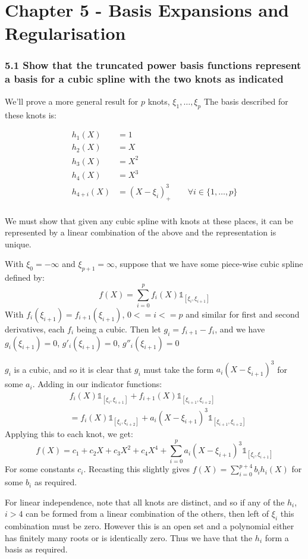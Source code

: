 
\chapter{Chapter 5 - Basis Expansions and Regularisation}

\subsection*{5.1 Show that the truncated power basis functions represent a basis for a cubic spline with the two knots as indicated}

We'll prove a more general result for $p$ knots, $\xi_1, \dots, \xi_p$
The basis described for these knots is:

\begin{align*}
    h_1(X) &= 1 \\
    h_2(X) &= X \\
    h_3(X) &= X^2 \\
    h_4(X) &= X^3 \\
    h_{4+i}(X) &= (X-\xi_i)^3_+ \hspace{2em}  \forall i \in \{1,\dots,p\} \\
\end{align*}

We must show that given any cubic spline with knots at these places, it can be represented by a linear combination of the above and the representation is unique.

With $\xi_0 = -\infty$ and $\xi_{p+1} = \infty$, suppose that we have some piece-wise cubic spline defined by: 
$$f(X) = \sum_{i=0}^p f_i(X)\mathbb{1}_{[\xi_i,\xi_{i+1}]}$$
With $f_i(\xi_{i+1}) = f_{i+1}(\xi_{i+1})$, $0 <= i <= p$ and similar for first and second derivatives, each $f_i$ being a cubic.
Then let $g_i = f_{i+1} - f_i$, and we have $g_i(\xi_{i+1})  = 0$,  $g'_i(\xi_{i+1})  = 0$,  $g''_i(\xi_{i+1})  = 0$

$g_i$ is a cubic, and so it is clear that $g_i$ must take the form $a_i(X - \xi_{i+1})^3$ for some $a_i$. Adding in our indicator functions:
\begin{align*}
    & f_i(X)\mathbb{1}_{[\xi_i,\xi_{i+1}]} + f_{i+1}(X)\mathbb{1}_{[\xi_{i+1},\xi_{i+2}]} \\
    &=  f_{i}(X)\mathbb{1}_{[\xi_i,\xi_{i+2}]} + a_i(X - \xi_{i+1})^3\mathbb{1}_{[\xi_{i+1},\xi_{i+2}]}
\end{align*}
Applying this to each knot, we get:
$$f(X) = c_1 + c_2 X + c_3 X^2 + c_4 X^4 + \sum_{i=0}^p a_i (X - \xi_{i+1})^3 \mathbb{1}_{[\xi_i,\xi_{i+1}]}$$ 
For some constants $c_i$. Recasting this slightly gives
$f(X) = \sum_{i=0}^{p+4} b_i h_i(X)$ for some $b_i$ as required.

For linear independence, note that all knots are distinct, and so if any of the $h_i$, $i>4$ can be formed from a linear combination of the others, then left of $\xi_i$ this combination must be zero. However this is an open set and a polynomial either has finitely many roots or is identically zero. Thus we have that the $h_i$ form a basis as required. 